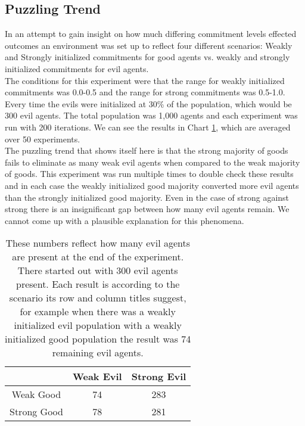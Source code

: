 \documentclass[]{article}
\begin{document}
\subsection{Puzzling Trend}
In an attempt to gain insight on how much differing commitment levels effected outcomes an environment was set up to reflect four different scenarios: Weakly and Strongly initialized commitments for good agents vs. weakly and strongly initialized commitments for evil agents. 
\\
The conditions for this experiment were that the range for weakly initialized commitments was 0.0-0.5 and the range for strong commitments was 0.5-1.0. Every time the evils were initialized at 30\% of the population, which would be 300 evil agents. The total population was 1,000 agents and each experiment was run with 200 iterations. We can see the results in Chart \ref{confusing}, which are averaged over 50 experiments. 
\\
The puzzling trend that shows itself here is that the strong majority of goods fails to eliminate as many weak evil agents when compared to the weak majority of goods. This experiment was run multiple times to double check these results and in each case the weakly initialized good majority converted more evil agents than the strongly initialized good majority. Even in the case of strong against strong there is an insignificant gap between how many evil agents remain. We cannot come up with a plausible explanation for this phenomena. 

\begin{table}
	\centering
	\begin{tabular}{| c | c  c | } 	
		\hline
		 & Weak Evil & Strong Evil \\ [0.5ex] 
		\hline\hline
		Weak Good & 74 & 283 \\ 		
		\hline
		Strong Good & 78 & 281 \\ [1ex] 
		\hline		
	\end{tabular}
	\caption{These numbers reflect how many evil agents are present at the end of the experiment. There started out with 300 evil agents present. Each result is according to the scenario its row and column titles suggest, for example when there was a weakly initialized evil population with a weakly initialized good population the result was 74 remaining evil agents.}
	\label{confusing}
\end{table}
\end{document}
